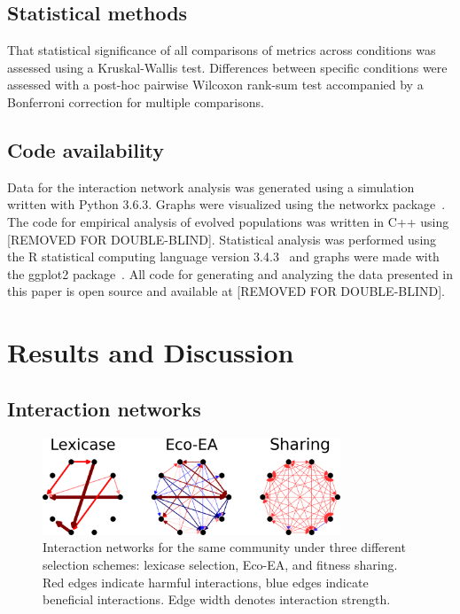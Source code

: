 \subsection{Statistical methods}
That statistical significance of all comparisons of metrics across conditions was assessed using a Kruskal-Wallis test. Differences between specific conditions were assessed with a post-hoc pairwise Wilcoxon rank-sum test accompanied by a Bonferroni correction for multiple comparisons.

\subsection{Code availability}
Data for the interaction network analysis was generated using a %
simulation written with Python 3.6.3. Graphs were visualized using the networkx package~\cite{hagberg_exploring_2008}. The code for empirical analysis of evolved populations was written in C++ using [REMOVED FOR DOUBLE-BLIND]. Statistical analysis was performed using the R statistical computing language version 3.4.3~\cite{r_core_team_r:_2017} and graphs were made with the ggplot2 package~\cite{wickham_ggplot2:_2009}. All code for generating and analyzing the data presented in this paper is open source and available at [REMOVED FOR DOUBLE-BLIND]. 

\section{Results and Discussion}

\subsection{Interaction networks}

\begin{figure}
\includegraphics[width=3.5in]{figs/interaction_networks.png}
\caption{Interaction networks for the same community under three different selection schemes: lexicase selection, Eco-EA, and fitness sharing. Red edges indicate harmful interactions, blue edges indicate beneficial interactions. Edge width denotes interaction strength.}
\label{interaction_network}
\end{figure}

